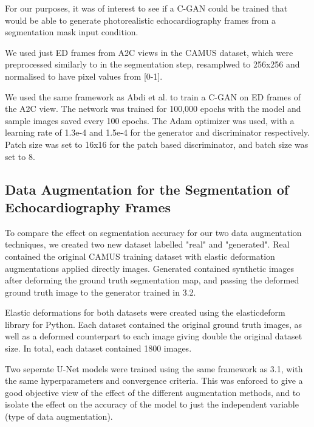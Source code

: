For our purposes, it was of interest to see if a C-GAN could be trained that
would be able to generate photorealistic echocardiography frames from a
segmentation mask input condition. \newline

We used just ED frames from A2C views in the CAMUS dataset, which were
preprocessed similarly to in the segmentation step, resamplwed to 256x256 and
normalised to have pixel values from [0-1]. \newline

We used the same framework as Abdi et al. to train a C-GAN on ED frames of the
A2C view. The network was trained for 100,000 epochs with the model and
sample images saved every 100 epochs. The Adam optimizer was used, with a
learning rate of 1.3e-4 and 1.5e-4 for the generator and discriminator
respectively. Patch size was set to 16x16 for the patch based discriminator, and
batch size was set to 8.\newline

\subsection{Data Augmentation for the Segmentation of Echocardiography Frames}

To compare the effect on segmentation accuracy for our two data augmentation
techniques, we created two new dataset labelled "real" and "generated". Real
contained the original CAMUS training dataset with elastic deformation
augmentations applied directly images. Generated contained synthetic images
after deforming the ground truth segmentation map, and passing the deformed
ground truth image to the generator trained in 3.2.
\newline

Elastic deformations for both datasets were created using the elasticdeform
library for Python. Each dataset contained the original ground truth images, as well
as a deformed counterpart to each image giving double the original dataset size. In total,
each dataset contained 1800 images. \newline

Two seperate U-Net models were trained using the same framework as 3.1, with the
same hyperparameters and convergence criteria. This was enforced to give a good
objective view of the effect of the different augmentation methods, and to
isolate the effect on the accuracy of the model to just the independent variable
(type of data augmentation). \newline